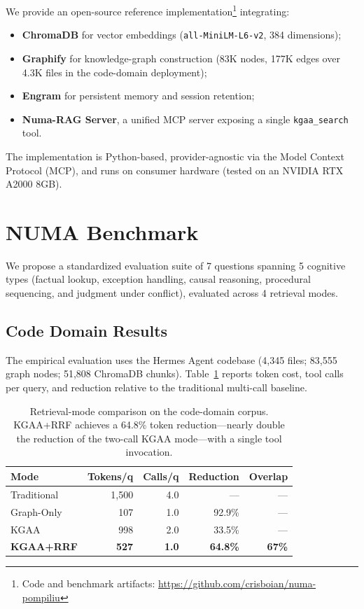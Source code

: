 \documentclass[11pt,a4paper]{article}
\begin{document}
We provide an open-source reference implementation\footnote{Code and benchmark artifacts: \url{https://github.com/crisboian/numa-pompiliu}} integrating:

\begin{itemize}
    \item \textbf{ChromaDB} for vector embeddings (\texttt{all-MiniLM-L6-v2}, 384 dimensions);
    \item \textbf{Graphify} for knowledge-graph construction (83K nodes, 177K edges over 4.3K files in the code-domain deployment);
    \item \textbf{Engram} for persistent memory and session retention;
    \item \textbf{Numa-RAG Server}, a unified MCP server exposing a single \texttt{kgaa\_search} tool.
\end{itemize}

The implementation is Python-based, provider-agnostic via the Model Context Protocol (MCP), and runs on consumer hardware (tested on an NVIDIA RTX A2000 8GB).

\section{NUMA Benchmark}

We propose a standardized evaluation suite of 7 questions spanning 5 cognitive types (factual lookup, exception handling, causal reasoning, procedural sequencing, and judgment under conflict), evaluated across 4 retrieval modes.

\subsection{Code Domain Results}

The empirical evaluation uses the Hermes Agent codebase (4,345 files; 83,555 graph nodes; 51,808 ChromaDB chunks). Table~\ref{tab:code} reports token cost, tool calls per query, and reduction relative to the traditional multi-call baseline.

\begin{table}[ht]
\centering
\caption{Retrieval-mode comparison on the code-domain corpus. KGAA+RRF achieves a 64.8\% token reduction---nearly double the reduction of the two-call KGAA mode---with a single tool invocation.}
\label{tab:code}
\begin{tabular}{lrrrr}
\hline
\textbf{Mode} & \textbf{Tokens/q} & \textbf{Calls/q} & \textbf{Reduction} & \textbf{Overlap} \\
\hline
Traditional & 1,500 & 4.0 & --- & --- \\
Graph-Only & 107 & 1.0 & 92.9\% & --- \\
KGAA & 998 & 2.0 & 33.5\% & --- \\
\textbf{KGAA+RRF} & \textbf{527} & \textbf{1.0} & \textbf{64.8\%} & \textbf{67\%} \\
\hline
\end{tabular}
\end{table}
\end{document}
